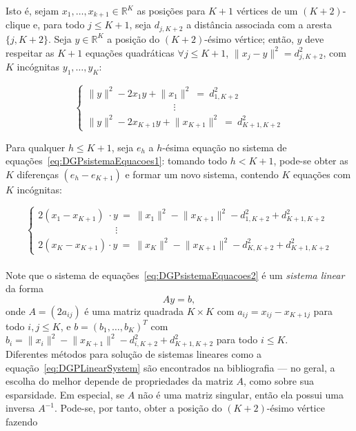 Isto é, sejam $x_1, \dots, x_{k+1} \in \mathbb{R}^{K}$ as posições para $K+1$ vértices de um $(K+2)$-clique e, para todo $j\leq K+1$, seja $d_{j,K+2}$ a distância associada com a aresta $\{j, K+2\}$. Seja $y \in \mathbb{R}^{K}$ a posição do $(K+2)$-ésimo vértice; então, $y$ deve respeitar as $K+1$ equações quadráticas $\forall j\leq K+1$, $\lVert x_j-y\rVert^2 = d_{j,K+2}^2$, com $K$ incógnitas  $y_1, \dots,y_{K}$:

\begin{equation}
	\begin{cases} 
		\lVert y \rVert^2 -2x_1y + \lVert x_1\rVert^2 \ = \ d^2_{1,K+2}
		\\
		\qquad\qquad\qquad\quad\qquad \!\vdots
		\\
		\lVert y \rVert^2 -2x_{K+1}y + \lVert x_{K+1}\rVert^2 \ = \ d^2_{K+1,K+2}
	\end{cases}
	\label{eq:DGPsistemaEquacoes1}
\end{equation}

Para qualquer $h\leq K+1$, seja $e_h$ a $h$-ésima equação no sistema de equações~\ref{eq:DGPsistemaEquacoes1}: tomando todo $h<K+1$, pode-se obter as $K$ diferenças $(e_h-e_{K+1})$ e formar um novo sistema,  contendo $K$ equações com $K$ incógnitas:

\begin{equation}
\begin{cases} 
2(x_1-x_{K+1}) \;\cdot y \ = \ \lVert x_1\rVert^2 - \lVert x_{K+1}\rVert^2 - d^2_{1,K+2} + d^2_{K+1,K+2} 
\\
\qquad\qquad\qquad\qquad\!\!\!\vdots
\\
2(x_{K}-x_{K+1}) \cdot y \ = \ \lVert x_{K}\rVert^2 - \lVert x_{K+1}\rVert^2 - d^2_{K,K+2} + d^2_{K+1,K+2} 
\end{cases}
\label{eq:DGPsistemaEquacoes2}
\end{equation}
\\

Note que o sistema de equações~\ref{eq:DGPsistemaEquacoes2} é um \textit{sistema linear} da forma 
\begin{equation}
	Ay=b,
	\label{eq:DGPLinearSystem}
\end{equation}
onde $A = (2a_{ij})$ é uma matriz quadrada $K \times K$ com $a_{ij} = x_{ij} - x_{K+1j}$ para todo $i,j \leq K$, e $b = (b_1, \dots, b_{K})^T$ com $b_i = \lVert x_i\rVert^2 - \lVert x_{K+1}\rVert^2 - d^2_{i,K+2} + d^2_{K+1,K+2}$ para todo $i\leq K$. 
\\

Diferentes métodos para solução de sistemas lineares como a equação~\ref{eq:DGPLinearSystem} são encontrados na bibliografia \cite{AlgebraLinearElon} --- no geral, a escolha do melhor depende de propriedades da matriz $A$, como sobre sua esparsidade. Em especial, se $A$ não é uma matriz singular, então ela possui uma inversa $A^{-1}$. Pode-se, por tanto, obter a posição do $(K+2)$-ésimo vértice fazendo

